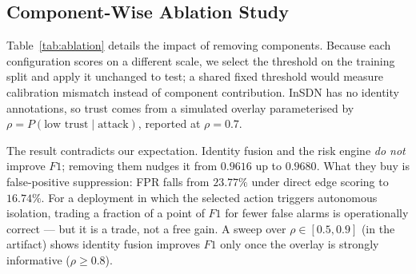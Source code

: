\documentclass[conference,a4paper]{IEEEtran}
\begin{document}
\begin{table}[htbp]
\caption{Baseline \& Model Quantization Comparison on Real InSDN. Each model is scored at its own $F1$-optimal threshold selected on the test split (see text). Italics mark models that outperform the proposed detector. Size is the tensor footprint for PyTorch models only.}
\label{tab:sota}
\begin{center}
\end{center}
\end{table}

\subsection{Component-Wise Ablation Study}
\label{sec:ablation}
Table~\ref{tab:ablation} details the impact of removing components. Because each configuration scores on a different scale, we select the threshold on the training split and apply it unchanged to test; a shared fixed threshold would measure calibration mismatch instead of component contribution. InSDN has no identity annotations, so trust comes from a simulated overlay parameterised by $\rho = P(\text{low trust} \mid \text{attack})$, reported at $\rho = 0.7$.

The result contradicts our expectation. Identity fusion and the risk engine \emph{do not} improve $F1$; removing them nudges it from $0.9616$ up to $0.9680$. What they buy is false-positive suppression: FPR falls from $23.77\%$ under direct edge scoring to $16.74\%$. For a deployment in which the selected action triggers autonomous isolation, trading a fraction of a point of $F1$ for fewer false alarms is operationally correct --- but it is a trade, not a free gain. A sweep over $\rho \in [0.5, 0.9]$ (in the artifact) shows identity fusion improves $F1$ only once the overlay is strongly informative ($\rho \ge 0.8$).
\end{document}
